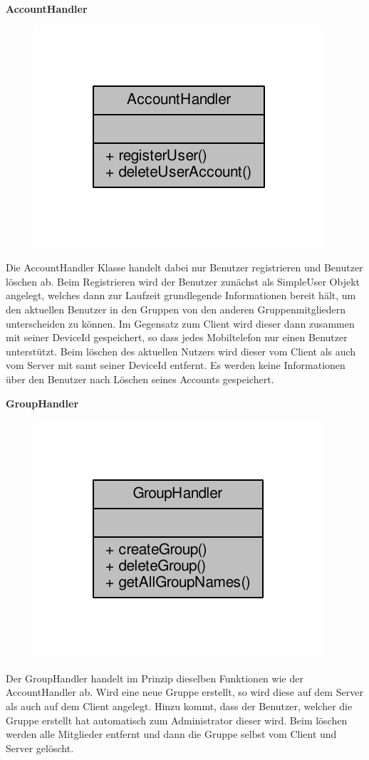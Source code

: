 \textbf{AccountHandler}
\begin{figure}[H]
	\includegraphics[scale = 1]{res/umlClasses/account_handler__coll__graph.pdf}
	\centering
\end{figure}
Die AccountHandler Klasse handelt dabei nur Benutzer registrieren und Benutzer löschen ab.
Beim Registrieren wird der Benutzer zunächst als SimpleUser Objekt angelegt, welches dann zur Laufzeit grundlegende Informationen bereit hält, um den aktuellen Benutzer in den Gruppen von den anderen Gruppenmitgliedern unterscheiden zu können. Im Gegensatz zum Client wird dieser dann zusammen mit seiner DeviceId gespeichert, so dass jedes Mobiltelefon nur einen Benutzer unterstützt.
Beim löschen des aktuellen Nutzers wird dieser vom Client als auch vom Server mit samt seiner DeviceId entfernt. Es werden keine Informationen über den Benutzer nach Löschen seines Accounts gespeichert.

\textbf{GroupHandler}
\begin{figure}[H]
	\includegraphics[scale = 1]{res/umlClasses/group_handler__coll__graph.pdf}
	\centering
\end{figure}
Der GroupHandler handelt im Prinzip dieselben Funktionen wie der AccountHandler ab. Wird eine neue Gruppe erstellt, so wird diese auf dem Server als auch auf dem Client angelegt. Hinzu kommt, dass der Benutzer, welcher die Gruppe erstellt hat automatisch zum Administrator dieser wird.
Beim löschen werden alle Mitglieder entfernt und dann die Gruppe selbst vom Client und Server gelöscht.

